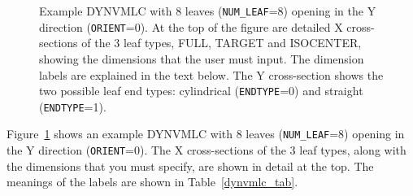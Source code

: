 \documentclass[12pt,twoside]{article}
\begin{document}
\begin{figure}[htpb]
\begin{center}
\begin{htmlonly}
\end{htmlonly}
\end{center}
\vspace*{-0.7cm}
\caption[DYNVMLC CM geometry]
{Example DYNVMLC with 8 leaves ({\tt NUM\_LEAF}=8) opening in the Y
direction ({\tt ORIENT}=0).  At the top of the figure
are detailed X cross-sections of the
3 leaf types, FULL, TARGET and ISOCENTER, showing the dimensions that the
user must input.  The dimension labels are explained in the text below.
The Y cross-section shows the two possible leaf end types: cylindrical ({\tt ENDTYPE}=0) and
straight ({\tt ENDTYPE}=1).}
\label{dynvmlc_fig}
\end{figure}

Figure~\ref{dynvmlc_fig} shows an example DYNVMLC with 8 leaves
({\tt NUM\_LEAF}=8) opening in the Y direction ({\tt ORIENT}=0).  The
X cross-sections of the 3 leaf types, along with the dimensions that
you must specify, are shown in detail at the top.  The meanings of the
labels are shown in Table~\ref{dynvmlc_tab}.
\end{document}
